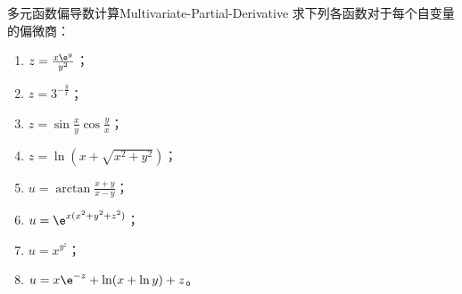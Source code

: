 \begin{problem}{多元函数偏导数计算}{Multivariate-Partial-Derivative}
    求下列各函数对于每个自变量的偏微商：
    \begin{enumerate}
        \item $z = \frac{x \e^y}{y^2}$；
        \item $z = 3^{-\frac{y}{x}}$；
        \item $z = \sin \frac{x}{y} \cos \frac{y}{x}$；
        \item $z = \ln(x + \sqrt{x^2 + y^2})$；
        \item $u = \arctan \frac{x + y}{x - y}$；
        \item $u = \e^{x(x^2 + y^2 + z^2)}$；
        \item $u = x^{y^z}$；
        \item $u = x \e^{-z} + \ln(x + \ln y) + z$。
    \end{enumerate}
\end{problem}

